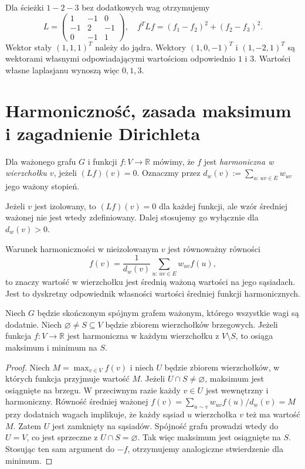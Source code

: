 \begin{przyklad}
Dla ścieżki $1-2-3$ bez dodatkowych wag otrzymujemy
\[
L=\begin{pmatrix}1&-1&0\\-1&2&-1\\0&-1&1\end{pmatrix},
\quad
f^TLf=(f_1-f_2)^2+(f_2-f_3)^2.
\]
Wektor stały $(1,1,1)^T$ należy do jądra.
Wektory $(1,0,-1)^T$ i $(1,-2,1)^T$ są wektorami własnymi
odpowiadającymi wartościom odpowiednio $1$ i $3$.
Wartości własne laplasjanu wynoszą więc $0,1,3$.
\end{przyklad}

\section{Harmoniczność, zasada maksimum i zagadnienie Dirichleta}
\label{sec:tg-harmonic}

\begin{definicja}
Dla ważonego grafu $G$ i funkcji $f:V\to\mathbb R$
mówimy, że $f$ jest \emph{harmoniczna w wierzchołku $v$},
jeżeli $(Lf)(v)=0$. Oznaczmy przez $d_w(v):=\sum_{u:\,uv\in E}w_{uv}$
jego ważony stopień.
\end{definicja}

Jeżeli $v$ jest izolowany, to $(Lf)(v)=0$ dla każdej funkcji,
ale wzór średniej ważonej nie jest wtedy zdefiniowany.
Dalej stosujemy go wyłącznie dla $d_w(v)>0$.

Warunek harmoniczności w nieizolowanym $v$ jest równoważny równości
\[
f(v)=\frac{1}{d_w(v)}\sum_{u:\,uv\in E}w_{uv}f(u),
\]
to znaczy wartość w wierzchołku jest średnią ważoną wartości
na jego sąsiadach. Jest to dyskretny odpowiednik
własności wartości średniej funkcji harmonicznych.

\begin{twierdzenie}
Niech $G$ będzie skończonym spójnym grafem ważonym, którego
wszystkie wagi są dodatnie. Niech $\varnothing\ne S\subseteq V$
będzie zbiorem wierzchołków brzegowych. Jeżeli funkcja
$f:V\to\mathbb R$ jest harmoniczna w każdym wierzchołku
z $V\setminus S$, to osiąga maksimum i minimum na $S$.
\end{twierdzenie}

\begin{proof}
Niech $M=\max_{v\in V}f(v)$ i niech $U$ będzie zbiorem
wierzchołków, w których funkcja przyjmuje wartość $M$.
Jeżeli $U\cap S\ne\varnothing$, maksimum jest osiągnięte
na brzegu. W przeciwnym razie każdy $v\in U$ jest
wewnętrzny i harmoniczny. Równość średniej ważonej
$f(v)=\sum_{u\sim v}w_{uv}f(u)/d_w(v)=M$ przy dodatnich wagach
implikuje, że każdy sąsiad $u$ wierzchołka $v$ też ma
wartość $M$. Zatem $U$ jest zamknięty na sąsiadów.
Spójność grafu prowadzi wtedy do $U=V$, co jest
sprzeczne z $U\cap S=\varnothing$.
Tak więc maksimum jest osiągnięte na $S$.
Stosując ten sam argument do $-f$, otrzymujemy
analogiczne stwierdzenie dla minimum.
\end{proof}

